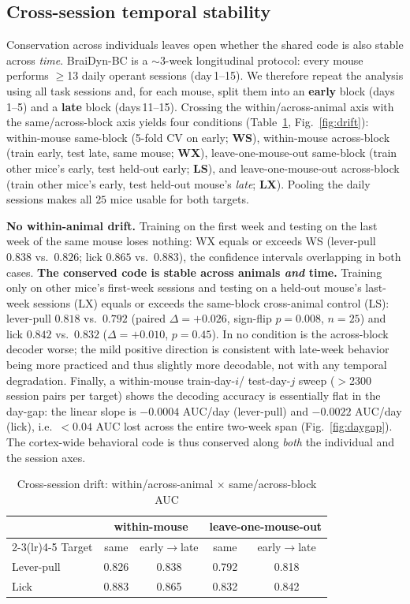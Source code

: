 \documentclass[conference]{IEEEtran}
\begin{document}
\subsection{Cross-session temporal stability}
\label{sec:drift}
Conservation across individuals leaves open whether the shared code is also stable across
\emph{time}. BraiDyn-BC is a $\sim$3-week longitudinal protocol: every mouse performs
$\geq$13 daily operant sessions (day\,1--15). We therefore repeat the analysis using all task
sessions and, for each mouse, split them into an \textbf{early} block (days\,1--5) and a
\textbf{late} block (days\,11--15). Crossing the within/across-animal axis with the
same/across-block axis yields four conditions (Table~\ref{tab:drift}, Fig.~\ref{fig:drift}):
within-mouse same-block (5-fold CV on early; \textbf{WS}), within-mouse across-block (train
early, test late, same mouse; \textbf{WX}), leave-one-mouse-out same-block (train other mice's
early, test held-out early; \textbf{LS}), and leave-one-mouse-out across-block (train other
mice's early, test held-out mouse's \emph{late}; \textbf{LX}). Pooling the daily sessions makes
all $25$ mice usable for both targets.

\textbf{No within-animal drift.} Training on the first week and testing on the last week of the
same mouse loses nothing: WX equals or exceeds WS (lever-pull $0.838$ vs.\ $0.826$; lick
$0.865$ vs.\ $0.883$), the confidence intervals overlapping in both cases. \textbf{The conserved
code is stable across animals \emph{and} time.} Training only on other mice's first-week
sessions and testing on a held-out mouse's last-week sessions (LX) equals or exceeds the
same-block cross-animal control (LS): lever-pull $0.818$ vs.\ $0.792$ (paired
$\Delta=+0.026$, sign-flip $p=0.008$, $n=25$) and lick $0.842$ vs.\ $0.832$
($\Delta=+0.010$, $p=0.45$). In no condition is the across-block decoder worse; the mild
positive direction is consistent with late-week behavior being more practiced and thus slightly
more decodable, not with any temporal degradation. Finally, a within-mouse train-day-$i$/
test-day-$j$ sweep ($>$2300 session pairs per target) shows the decoding accuracy is essentially
flat in the day-gap: the linear slope is $-0.0004$ AUC/day (lever-pull) and $-0.0022$ AUC/day
(lick), i.e.\ $<0.04$ AUC lost across the entire two-week span (Fig.~\ref{fig:daygap}). The
cortex-wide behavioral code is thus conserved along \emph{both} the individual and the session
axes.

\begin{table}[t]\centering
\caption{Cross-session drift: within/across-animal $\times$ same/across-block AUC}
\label{tab:drift}
\begin{tabular}{lcccc}
\toprule
 & \multicolumn{2}{c}{within-mouse} & \multicolumn{2}{c}{leave-one-mouse-out} \\
\cmidrule(lr){2-3}\cmidrule(lr){4-5}
Target & same & early$\to$late & same & early$\to$late \\
\midrule
Lever-pull & 0.826 & 0.838 & 0.792 & 0.818 \\
Lick       & 0.883 & 0.865 & 0.832 & 0.842 \\
\bottomrule
\end{tabular}
\end{table}
\end{document}
